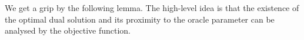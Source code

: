 We get a grip by the following lemma.
The high-level idea is that the existence of the optimal dual solution and its proximity to the oracle parameter can be analysed by the objective function.






